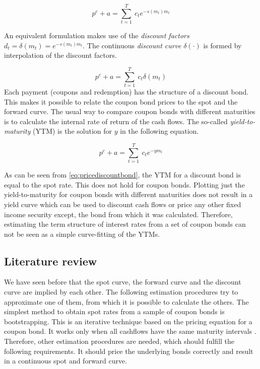 \begin{equation*}
  \label{bondpriceeq}
  p^c+a = \sum_{t=1}^T \ c_t e^{-s(m_t)m_t}
\end{equation*}

An equivalent formulation makes use of the \emph{discount factors} $d_t=\delta(m_t)=e^{-s(m_t)m_t}$. The continuous \emph{discount curve} $\delta(\cdot)$ is formed by interpolation of the discount factors.


\begin{equation*}
  \label{bondprceq2}
  p^c+a=\sum_{t=1}^T \ c_t \delta(m_t) 
\end{equation*}
Each payment (coupons and redemption) has the structure of a discount bond. This makes it possible to relate the coupon bond prices to the spot and the forward curve. The usual way to compare coupon bonds with different maturities is to calculate the internal rate of return of the cash flows. The so-called \emph{yield-to-maturity} (YTM) is the solution for $y$ in the following equation.

\begin{equation}
   \label{eq:yield}
   p^c+a=\sum_{t=1}^T \ c_t e^{-ym_t}
 \end{equation}

As can be seen from \eqref{eq:pricediscountbond}, the YTM for a discount bond is equal to the spot rate. This does not hold for coupon bonds. Plotting just the yield-to-maturity for coupon bonds with different maturities does not result in a yield curve which can be used to discount cash flows or price any other fixed income security except, the bond from which it was calculated. Therefore, estimating the term structure of interest rates from a set of coupon bonds can not be seen as a simple curve-fitting of the YTMs.

\subsection{Literature review}

We have seen before that the spot curve, the forward curve and the discount curve are implied by each other. The following estimation procedures try to approximate one of them, from which it is possible to calculate the others. The simplest method to obtain spot rates from a sample of coupon bonds is bootstrapping. This is an iterative technique based on the pricing equation for a coupon bond. It works only when all cashflows have the same maturity intervals \citep[see, e.g.][]{Hagan2006}. Therefore, other estimation procedures are needed, which should fulfill the following requirements. It should price the underlying bonds correctly and result in a continuous spot and forward curve. 

